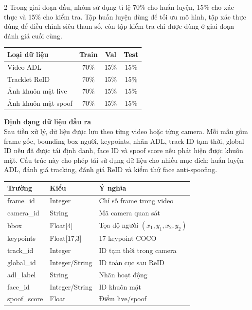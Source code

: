 \documentclass[a4paper, twoside, 12pt]{article}
\begin{document}
\begin{multicols}{2}
Trong giai đoạn đầu, nhóm sử dụng tỉ lệ 70\% cho huấn luyện, 15\% cho xác thực và 15\% cho kiểm tra. Tập huấn luyện dùng để tối ưu mô hình, tập xác thực dùng để điều chỉnh siêu tham số, còn tập kiểm tra chỉ được dùng ở giai đoạn đánh giá cuối cùng.

\vspace{0.2cm}
\begin{center}
\label{tab:cpose_split}
\renewcommand{\arraystretch}{1.2}
\scriptsize
\begin{tabular}{|p{2.8cm}|c|c|c|}
\hline
\textbf{Loại dữ liệu} & \textbf{Train} & \textbf{Val} & \textbf{Test} \\
\hline
Video ADL & 70\% & 15\% & 15\% \\
\hline
Tracklet ReID & 70\% & 15\% & 15\% \\
\hline
Ảnh khuôn mặt live & 70\% & 15\% & 15\% \\
\hline
Ảnh khuôn mặt spoof & 70\% & 15\% & 15\% \\
\hline
\end{tabular}
\end{center}

\vspace{0.1cm}
\hspace*{0.5cm}\textbf{Định dạng dữ liệu đầu ra}\\
Sau tiền xử lý, dữ liệu được lưu theo từng video hoặc từng camera. Mỗi mẫu gồm frame gốc, bounding box người, keypoints, nhãn ADL, track ID tạm thời, global ID nếu đã được tái định danh, face ID và spoof score nếu phát hiện được khuôn mặt. Cấu trúc này cho phép tái sử dụng dữ liệu cho nhiều mục đích: huấn luyện ADL, đánh giá tracking, đánh giá ReID và kiểm thử face anti-spoofing.

\vspace{0.2cm}
\begin{center}
\label{tab:cpose_output_format}
\renewcommand{\arraystretch}{1.2}
\scriptsize
\begin{tabular}{|p{2.3cm}|p{2.2cm}|p{3.1cm}|}
\hline
\textbf{Trường} & \textbf{Kiểu} & \textbf{Ý nghĩa} \\
\hline
frame\_id & Integer & Chỉ số frame trong video \\
\hline
camera\_id & String & Mã camera quan sát \\
\hline
bbox & Float[4] & Tọa độ người $(x_1,y_1,x_2,y_2)$ \\
\hline
keypoints & Float[17,3] & 17 keypoint COCO \\
\hline
track\_id & Integer & ID tạm thời trong camera \\
\hline
global\_id & Integer/String & ID toàn cục sau ReID \\
\hline
adl\_label & String & Nhãn hoạt động \\
\hline
face\_id & Integer/String & ID khuôn mặt \\
\hline
spoof\_score & Float & Điểm live/spoof \\
\hline
\end{tabular}
\end{center}


\end{multicols}
\end{document}
